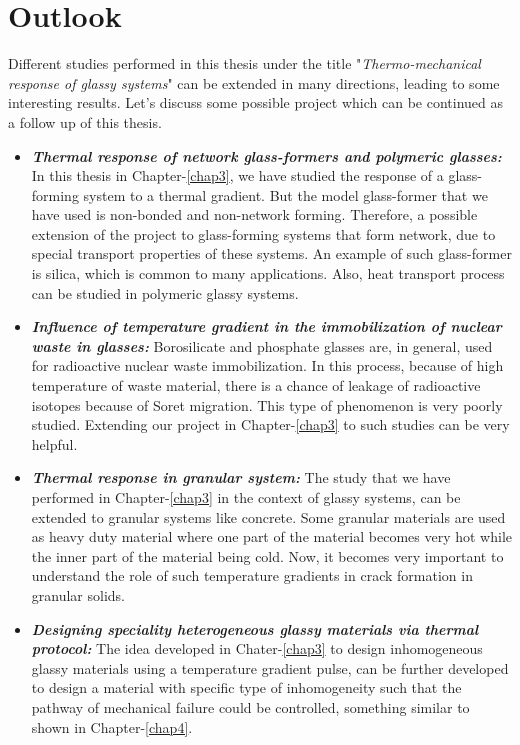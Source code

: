 \section{Outlook}
Different studies performed in this thesis under the title "{\em Thermo-mechanical response of glassy systems}" can be extended in many directions, leading to some interesting results. Let's discuss some possible project which can be continued as a follow up of this thesis.

\begin{itemize}
    \item {\bf \em Thermal response of network glass-formers and polymeric glasses:} In this thesis in Chapter-\ref{chap3}, we have studied the response of a glass-forming system to a thermal gradient. But the model glass-former that we have used is non-bonded and non-network forming. Therefore, a possible extension of the project to glass-forming systems that form network, due to special transport properties of these systems. An example of such glass-former is silica, which is common to many applications. Also, heat transport process can be studied in polymeric glassy systems.
    
    \item {\bf \em Influence of temperature gradient in the immobilization of nuclear waste in glasses:} Borosilicate and phosphate glasses are, in general, used for radioactive nuclear waste immobilization. In this process, because of high temperature of waste material, there is a chance of leakage of radioactive isotopes because of Soret migration. This type of phenomenon is very poorly studied. Extending our project in Chapter-\ref{chap3} to such studies can be very helpful.
    
    \item {\bf \em Thermal response in granular system:} The study that we have performed in Chapter-\ref{chap3} in the context of glassy systems, can be extended to granular systems like concrete. Some granular materials are used as heavy duty material where one part of the material becomes very hot while the inner part of the material being cold. Now, it becomes very important to understand the role of such temperature gradients in crack formation in granular solids.
    
    \item {\bf \em Designing speciality heterogeneous glassy materials via thermal protocol:} The idea developed in Chater-\ref{chap3} to design inhomogeneous glassy materials using a temperature gradient pulse, can be further developed to design a material with specific type of inhomogeneity such that the pathway of mechanical failure could be controlled, something similar to shown in Chapter-\ref{chap4}.
    

\end{itemize}
